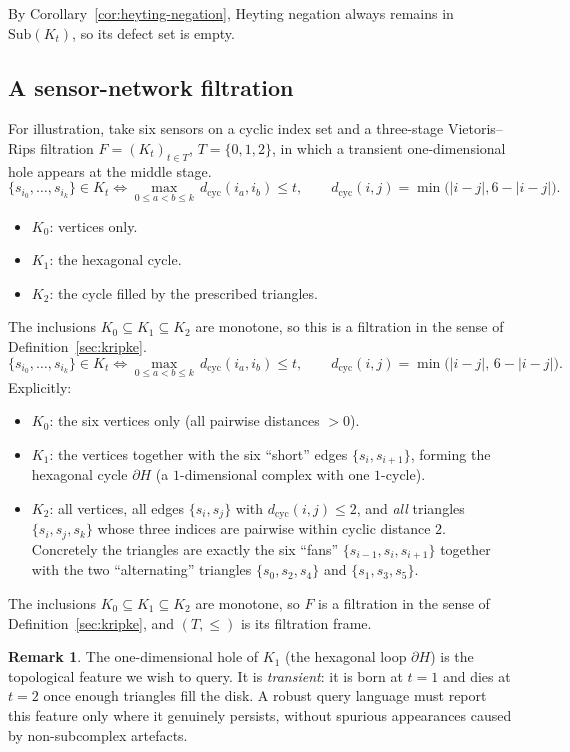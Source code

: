 \documentclass[final,12pt]{elsarticle}
\theoremstyle{plain}
\theoremstyle{definition}
\newtheorem{rem}[thm]{Remark}
\begin{document}
By Corollary~\ref{cor:heyting-negation}, Heyting negation always remains in
$\mathrm{Sub}(K_t)$, so its defect set is empty.



\subsection{A sensor-network filtration}
\label{subsec:sensor-network}
For illustration, take six sensors on a cyclic index set and a three-stage
Vietoris--Rips filtration $F=(K_t)_{t\in T}$, $T=\{0,1,2\}$, in which a
transient one-dimensional hole appears at the middle stage.
\[
\{s_{i_0},\dots,s_{i_k}\}\in K_t
\iff
\max_{0\le a<b\le k}\, d_{\mathrm{cyc}}(i_a,i_b)\le t,
\qquad
d_{\mathrm{cyc}}(i,j)=\min\bigl(|i-j|,6-|i-j|\bigr).
\]
\begin{itemize}
  \item $K_0$: vertices only.
  \item $K_1$: the hexagonal cycle.
  \item $K_2$: the cycle filled by the prescribed triangles.
\end{itemize}
The inclusions $K_0\subseteq K_1\subseteq K_2$ are monotone, so this is a
filtration in the sense of Definition~\ref{sec:kripke}.
\[
\{s_{i_0},\dots,s_{i_k}\}\in K_t
\iff
\max_{0\le a<b\le k}\, d_{\mathrm{cyc}}(i_a,i_b)\le t,
\qquad
d_{\mathrm{cyc}}(i,j)=\min\bigl(|i-j|,\,6-|i-j|\bigr).
\]
Explicitly:
\begin{itemize}
  \item $K_0$: the six vertices only (all pairwise distances $>0$).
  \item $K_1$: the vertices together with the six ``short'' edges
        $\{s_i,s_{i+1}\}$, forming the hexagonal cycle $\partial H$
        (a $1$-dimensional complex with one $1$-cycle).
  \item $K_2$: all vertices, all edges $\{s_i,s_j\}$ with
        $d_{\mathrm{cyc}}(i,j)\le 2$, and \emph{all} triangles
        $\{s_i,s_j,s_k\}$ whose three indices are pairwise within cyclic
        distance $2$. Concretely the triangles are exactly the six
        ``fans'' $\{s_{i-1},s_i,s_{i+1}\}$ together with the two
        ``alternating'' triangles $\{s_0,s_2,s_4\}$ and
        $\{s_1,s_3,s_5\}$.
\end{itemize}
The inclusions $K_0\subseteq K_1\subseteq K_2$ are monotone, so $F$ is a
filtration in the sense of Definition~\ref{sec:kripke}, and $(T,\le)$ is
its filtration frame.

\begin{rem}
The one-dimensional hole of $K_1$ (the hexagonal loop $\partial H$) is
the topological feature we wish to query. It is \emph{transient}: it is
born at $t=1$ and dies at $t=2$ once enough triangles fill the disk. A
robust query language must report this feature only where it genuinely
persists, without spurious appearances caused by non-subcomplex
artefacts.
\end{rem}
\end{document}
